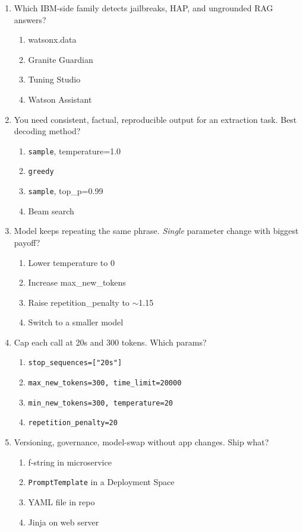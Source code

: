 \begin{enumerate}[leftmargin=*]
\item Which IBM-side family detects jailbreaks, HAP, and ungrounded RAG answers?
\begin{enumerate}[label=\Alph*.]
  \item watsonx.data \item Granite Guardian \item Tuning Studio \item Watson Assistant
\end{enumerate}

\item You need consistent, factual, reproducible output for an extraction task. Best decoding method?
\begin{enumerate}[label=\Alph*.]
  \item \texttt{sample}, temperature=1.0 \item \texttt{greedy}
  \item \texttt{sample}, top\_p=0.99 \item Beam search
\end{enumerate}

\item Model keeps repeating the same phrase. \emph{Single} parameter change with biggest payoff?
\begin{enumerate}[label=\Alph*.]
  \item Lower temperature to 0 \item Increase max\_new\_tokens
  \item Raise repetition\_penalty to $\sim$1.15 \item Switch to a smaller model
\end{enumerate}

\item Cap each call at 20s and 300 tokens. Which params?
\begin{enumerate}[label=\Alph*.]
  \item \texttt{stop\_sequences=["20s"]}
  \item \texttt{max\_new\_tokens=300, time\_limit=20000}
  \item \texttt{min\_new\_tokens=300, temperature=20}
  \item \texttt{repetition\_penalty=20}
\end{enumerate}

\item Versioning, governance, model-swap without app changes. Ship what?
\begin{enumerate}[label=\Alph*.]
  \item f-string in microservice \item \texttt{PromptTemplate} in a Deployment Space
  \item YAML file in repo \item Jinja on web server
\end{enumerate}


\end{enumerate}
